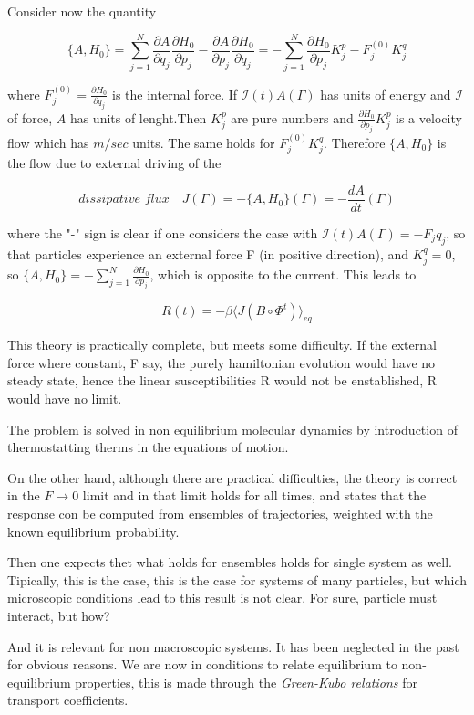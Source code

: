 \documentclass{article}
\begin{document}
Consider now the quantity

$$\{ A, H_0 \} = \sum_{j=1}^{N}  \frac{\partial A}{\partial q_j}  \frac{\partial H_0}{\partial p_j} -  \frac{\partial A}{\partial p_j}  \frac{\partial H_0}{\partial q_j} = -  \sum_{j=1}^{N}\frac{\partial H_0}{\partial p_j} K^p_j - F^{(0)}_j K^q_j  $$

where $ F^{(0)}_j =  \frac{\partial H_0}{\partial q_j}$ is the internal force. If $\mathcal{I}(t) A(\Gamma)$ has units of energy and $\mathcal{I}$ of force, $A$ has units of lenght.Then $K^p_j$ are pure numbers and $ \frac{\partial H_0}{\partial p_j} K^p_j$ is a velocity flow which has $m/sec$ units. The same holds for $ F^{(0)}_j K^q_j$. Therefore $\{ A, H_0\}$ is the flow due to external driving of the

$$ \textit{dissipative flux} \quad J(\Gamma) = -\{ A, H_0\}(\Gamma)= -\frac{dA}{dt}(\Gamma)$$

where the "-" sign is clear if one considers the case with $\mathcal{I}(t) A(\Gamma) = -F_j q_j$, so that particles experience an external force F (in positive direction), and $K^q_j=0$, so $\{ A, H_0 \} = - \sum_{j=1}^{N} \frac{\partial H_0}{\partial p_j}$, which is opposite to the current. This leads to

$$ R(t) = -\beta \langle J (B \circ \Phi^t ) \rangle_{eq} $$

This theory is practically complete, but meets some difficulty. If the external force where constant, F say, the purely hamiltonian evolution would have no steady state, hence the linear susceptibilities R would not be enstablished, R would have no limit.

The problem is solved in non equilibrium molecular dynamics by introduction of thermostatting therms in the equations of motion.

On the other hand, although there are practical difficulties, the theory is correct in the $F \to 0$ limit and in that limit holds for all times, and states that the response con be computed from ensembles of trajectories, weighted with the known equilibrium probability.

Then one expects thet what holds for ensembles holds for single system as well. Tipically, this is the case, this is the case for systems of many particles, but which microscopic conditions lead to this result is not clear. For sure, particle must interact, but how?

And it is relevant for non macroscopic systems. It has been neglected in the past for obvious reasons. We are now in conditions to relate equilibrium to non-equilibrium properties, this is made through  the \emph{ Green-Kubo relations} for transport coefficients.
\end{document}
